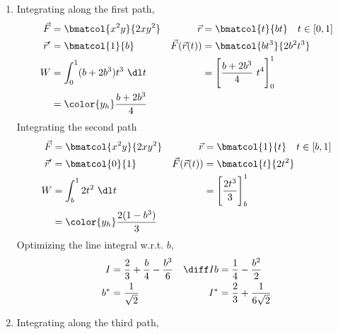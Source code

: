 \begin{enumerate}
\begin{enumerate}
              \item Integrating along the first path,
                    \begin{align}
                        \vec{F}             & = \bmatcol{x^2y}{2xy^2}              &
                        \vec{r}             & = \bmatcol{t}{bt} \quad t \in [0, 1]   \\
                        \vec{r}'            & = \bmatcol{1}{b}                     &
                        \vec{F}(\vec{r}(t)) & = \bmatcol{bt^3}{2b^2t^3}              \\
                        W                   & = \int_{0}^{1}(b + 2b^3)t^3\ \dl t   &
                                            & = \Bigg[\frac{b + 2b^3}{4}\ t^4
                        \Bigg]_0^1                                                   \\
                                            & = \color{y_h} \frac{b + 2b^3}{4}
                    \end{align}
                    Integrating the second path
                    \begin{align}
                        \vec{F}             & = \bmatcol{x^2y}{2xy^2}             &
                        \vec{r}             & = \bmatcol{1}{t} \quad t \in [b, 1]   \\
                        \vec{r}'            & = \bmatcol{0}{1}                    &
                        \vec{F}(\vec{r}(t)) & = \bmatcol{t}{2t^2}                   \\
                        W                   & = \int_{b}^{1} 2t^2\ \dl t          &
                                            & = \Bigg[ \frac{2t^3}{3}
                        \Bigg]_b^1                                                  \\
                                            & = \color{y_h} \frac{2(1 - b^3)}{3}
                    \end{align}
                    Optimizing the line integral w.r.t. $ b $,
                    \begin{align}
                        I        & = \frac{2}{3} + \frac{b}{4} - \frac{b^3}{6} &
                        \diff Ib & = \frac{1}{4} - \frac{b^2}{2}                 \\
                        b^*      & = \frac{1}{\sqrt{2}}                        &
                        I^*      & = \frac{2}{3} + \frac{1}{6\sqrt{2}}
                    \end{align}
              \item Integrating along the third path,

\end{enumerate}
\end{enumerate}
